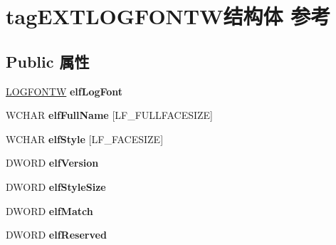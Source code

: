 \hypertarget{structtag_e_x_t_l_o_g_f_o_n_t_w}{}\section{tag\+E\+X\+T\+L\+O\+G\+F\+O\+N\+T\+W结构体 参考}
\label{structtag_e_x_t_l_o_g_f_o_n_t_w}
\subsection*{Public 属性}
\begin{DoxyCompactItemize}
\item 
\mbox{\label{structtag_e_x_t_l_o_g_f_o_n_t_w_a7fc76a9d63c89444d491644ce29b31e1}} 
\hyperlink{struct_l_o_g_f_o_n_t_w}{L\+O\+G\+F\+O\+N\+TW} {\bfseries elf\+Log\+Font}
\item 
\mbox{\label{structtag_e_x_t_l_o_g_f_o_n_t_w_a1ad03af94054191d58703c4e3a585379}} 
W\+C\+H\+AR {\bfseries elf\+Full\+Name} \mbox{[}L\+F\+\_\+\+F\+U\+L\+L\+F\+A\+C\+E\+S\+I\+ZE\mbox{]}
\item 
\mbox{\label{structtag_e_x_t_l_o_g_f_o_n_t_w_ae10012ca04546b26fcf832ea8e4fc351}} 
W\+C\+H\+AR {\bfseries elf\+Style} \mbox{[}L\+F\+\_\+\+F\+A\+C\+E\+S\+I\+ZE\mbox{]}
\item 
\mbox{\label{structtag_e_x_t_l_o_g_f_o_n_t_w_aad35f219806174c768e09025a54b06bb}} 
D\+W\+O\+RD {\bfseries elf\+Version}
\item 
\mbox{\label{structtag_e_x_t_l_o_g_f_o_n_t_w_a054a6ecb38b402bbcd86d4cb108061a5}} 
D\+W\+O\+RD {\bfseries elf\+Style\+Size}
\item 
\mbox{\label{structtag_e_x_t_l_o_g_f_o_n_t_w_ab2e3f73a946a475e16c34d9489afe768}} 
D\+W\+O\+RD {\bfseries elf\+Match}
\item 
\mbox{\label{structtag_e_x_t_l_o_g_f_o_n_t_w_ac1a3b3e47f3d1613660dc9f6d94ee239}} 
D\+W\+O\+RD {\bfseries elf\+Reserved}
\item 
\mbox{\label{structtag_e_x_t_l_o_g_f_o_n_t_w_a3ea68e443031c3243ca47e22c8980fb5}} 

\end{DoxyCompactItemize}

